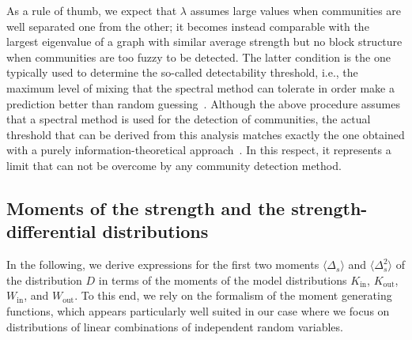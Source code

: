 \documentclass[a4paper,pre,superscriptaddress,floatfix,nofootinbib,twocolumn]{revtex4-1}
\begin{document}
As a rule of thumb, we expect that $\lambda$ assumes large values when communities are well separated one from the other; it becomes instead comparable with the largest eigenvalue of a graph with similar average strength but no block structure when communities are too fuzzy to be detected. The latter condition is the one typically used to determine the so-called detectability threshold, i.e., the maximum level of mixing that the spectral method can tolerate in order make a prediction better than random guessing~\cite{nadakuditi2012graph}.
Although the above procedure assumes that a spectral method  is used for the detection of communities, the actual threshold that can be derived from this analysis matches exactly the one obtained with a purely information-theoretical approach~\cite{abbe2015community}. In this respect, it represents a limit that can not be overcome by any community detection method.





\subsection*{Moments of the strength and the strength-differential distributions}

In the following, we derive expressions for the first two moments $\langle \Delta_s \rangle$ and $\langle \Delta_s^2 \rangle$ of the distribution $D$ in terms of the moments of the model distributions $K_\text{in}$, $K_\text{out}$, $W_\text{in}$, and $W_\text{out}$. To this end, we rely on the formalism of the moment generating functions, which appears particularly well suited in our case where we focus on distributions of linear combinations of independent random variables.
\end{document}
